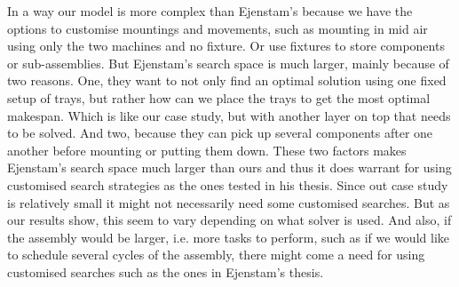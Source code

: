 In a way our model is more complex than Ejenstam's because we have the options to customise mountings and movements, such as mounting in mid air using only the two machines and no fixture. Or use fixtures to store components or sub-assemblies. But Ejenstam's search space is much larger, mainly because of two reasons. One, they want to not only find an optimal solution using one fixed setup of trays, but rather how can we place the trays to get the most optimal makespan. Which is like our case study, but with another layer on top that needs to be solved. And two, because they can pick up several components after one another before mounting or putting them down. These two factors makes Ejenstam's search space much larger than ours and thus it does warrant for using customised search strategies as the ones tested in his thesis. Since out case study is relatively small it might not necessarily need some customised searches. But as our results show, this seem to vary depending on what solver is used. And also, if the assembly would be larger, i.e. more tasks to perform, such as if we would like to schedule several cycles of the assembly, there might come a need for using customised searches such as the ones in Ejenstam's thesis.

